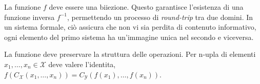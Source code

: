 \begin{description}[leftmargin=1.5em, style=nextline, font=\bfseries]
    \item[Biunivocità] 
        La funzione $f$ deve essere una biiezione. Questo garantisce l'esistenza di una funzione inversa $f^{-1}$, permettendo
        un processo di \emph{round-trip} tra due domini. In un sistema formale, ciò assicura che non vi sia perdita di contenuto 
        informativo, ogni elemento del primo sistema ha un'immagine unica nel secondo e viceversa.
    \item[Omomorfismo]
        La funzione deve preservare la struttura delle operazioni. Per n-upla di elementi $x_1, \dots, x_n \in \mathcal{X}$ deve 
        valere l'identita, $f(C_{\mathcal{X}}(x_1, \dots, x_n)) = C_{\mathcal{Y}}(f(x_1), \dots, f(x_n))$.
\end{description}

